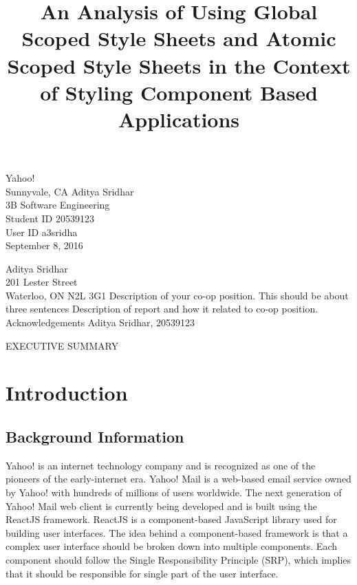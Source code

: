 \documentclass[12pt]{article}
\begin{document}
\title{An Analysis of Using Global Scoped Style Sheets and Atomic Scoped Style Sheets in the Context of Styling Component Based Applications}
{
	Yahoo!\\
	Sunnyvale, CA
}
{
	Aditya Sridhar\\
	3B Software Engineering\\
	Student ID 20539123\\
	User ID a3sridha\\
	September 8, 2016
}


{
	\noindent
	Aditya Sridhar\\
	201 Lester Street\\
	Waterloo, ON N2L 3G1
}
{
	Description of your co-op position. This should be about three sentences
}
{
	Description of report and how it related to co-op position.
}
{
	Acknowledgements
}
{
	Aditya Sridhar, 20539123
}


EXECUTIVE SUMMARY
\newpage




\toc


\section{Introduction}
\subsection{Background Information}


Yahoo! is an internet technology company and is recognized as one of the pioneers of the early-internet era. Yahoo! Mail is a web-based email service owned by Yahoo! with hundreds of millions of users worldwide. The next generation of Yahoo! Mail web client is currently being developed and is built using the ReactJS framework. ReactJS is a component-based JavaScript library used for building user interfaces. The idea behind a component-based framework is that a complex user interface should be broken down into multiple components. Each component should follow the Single Responsibility Principle (SRP), which implies that it should be responsible for single part of the user interface.
\end{document}
